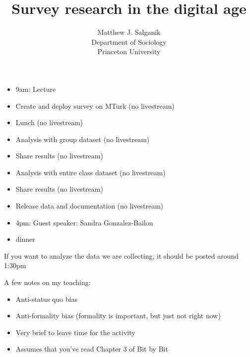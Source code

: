 \documentclass[aspectratio=169]{beamer}
\title[]{Survey research in the digital age}
\author[]{Matthew J. Salganik\\Department of Sociology\\Princeton University}
\date[]{Summer Institute in Computational Social Science\\June 22, 2017
\vfill
\begin{flushright}
\vspace{0.6in}
\texttt{[image: figures/cc-by.png]}
\end{flushright}
}
\begin{document}
\frame{\titlepage}
\begin{frame}

\begin{itemize}
\item 9am: Lecture 
\item Create and deploy survey on MTurk (no livestream)
\item Lunch (no livestream)
\item Analysis with group dataset (no livestream)
\item Share results (no livestream)
\item Analysis with entire class dataset (no livestream)
\item Share results (no livestream)
\item Release data and documentation (no livestream)
\item 4pm: Guest speaker: Sandra Gonzalez-Bailon
\item dinner
\end{itemize}

\vfill
If you want to analyze the data we are collecting, it should be posted around 1:30pm

\end{frame}
\begin{frame}

A few notes on my teaching:
\begin{itemize}
\item Anti-status quo bias
\pause
\item Anti-formality bias (formality is important, but just not right now)
\pause
\item Very brief to leave time for the activity
\pause
\item Assumes that you've read Chapter 3 of Bit by Bit
\end{itemize}

\end{frame}
\end{document}

